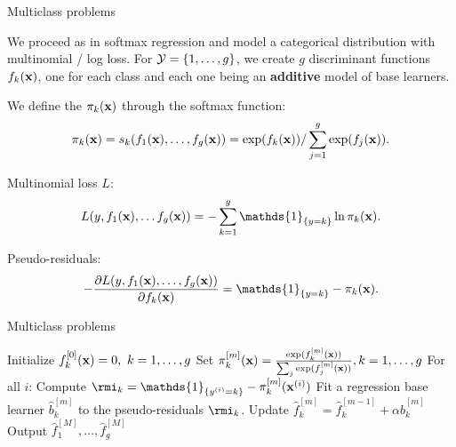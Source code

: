 \documentclass[11pt,compress,t,notes=noshow, xcolor=table]{beamer}
\begin{document}
\begin{framev}{Multiclass problems}

We proceed as in softmax regression and model a categorical distribution with multinomial / log loss.
For $\mathcal{Y} = \{1, \ldots, g\}$, we create $g$ discriminant functions $f_{k}(\mathbf{x})$, one for each class and each one being an \textbf{additive} model of base learners.

We define the $\pi_k(\mathbf{x})$ through the softmax function:
$$ \pi_{k}(\mathbf{x}) = s_k(f_1(\mathbf{x}), \ldots, f_g(\mathbf{x})) = \exp(f_{k}(\mathbf{x})) / \sum_{j=1}^g \exp(f_j(\mathbf{x})). $$

Multinomial loss $L$:
$$ L(y, f_1(\xv), \ldots f_g(\xv)) = - \sumkg \mathds{1}_{\{y = k\}} \ln \pikx. $$

Pseudo-residuals:
$$-\pd{L(y, f_1(\xv), \ldots, f_g(\xv))}{\fkx} =  \mathds{1}_{\{y = k\}} - \pikx. $$


\end{framev}
\begin{framev}{Multiclass problems}

\begin{algorithm}[H]
  \begin{footnotesize}
  \begin{center}
  \caption{GB for Multiclass}
    \begin{algorithmic}[1]
      \State Initialize $f_{k}^{[0]}(\mathbf{x}) = 0,\ k = 1,\ldots,g$
      \State Set $\pi_{k}^{[m]}(\mathbf{x}) = \frac{\exp(f_k^{[m]}(\mathbf{x}))}{\sum_j \exp(f_j^{[m]}(\mathbf{x}))}, k = 1,\ldots,g$
            \State For all $i$: Compute $\rmi_k = \mathds{1}_{\{\yi = k\}} - \pik^{[m]}(\xi)$
              \State Fit a regression base learner $\hat{b}^{[m]}_k$ to the pseudo-residuals $\rmi_k$.
              \State Update $\hat{f}_k^{[m]} = \hat{f}_k^{[m-1]} + \alpha \hat{b}^{[m]}_k$
            \EndFor
      \EndFor
    \State Output $\hat{f}_1^{[M]}, \ldots, \hat{f}_g^{[M]}$
    \end{algorithmic}
    \end{center}
    \end{footnotesize}
\end{algorithm}

\end{framev}

	
	
\end{document}
